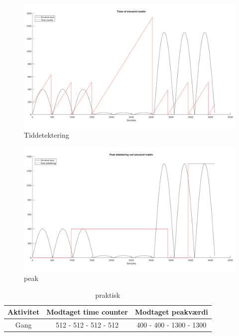 \begin{figure}[H]
	\centering
	\includegraphics[scale=0.6]{figures/cDesign/test_timecount_inaktiv.png}
	\caption{Tiddetektering }
	\label{fig:algoritme_cykling}
\end{figure}

\begin{figure}[H]
	\centering
	\includegraphics[scale=0.6]{figures/cDesign/test_peak_inaktiv.png}
	\caption{peak}
	\label{fig:algoritme_cykling}
\end{figure}


\begin{table}[H]
	\centering
	\begin{tabular}{ccc}
		\hline
		\rowcolor[HTML]{C0C0C0} 
		Aktivitet & Modtaget time counter & Modtaget peakværdi \\ \hline
		Gang & 512 - 512 - 512 - 512 & 400 - 400 - 1300 - 1300 \\ \hline
	\end{tabular}
	\caption{praktisk}
	\label{my-label}
\end{table}






